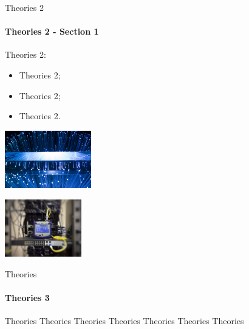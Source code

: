 \documentclass[t]{beamer}
\begin{document}
\begin{frame}{Theories 2}
\framesubtitle{Theories 2 - Section 1}
\label{P6 Theories}

Theories 2:
\begin{itemize}
\item Theories 2;
\item Theories 2;
\item Theories 2.
\end{itemize} 

\begin{center} 
        \begin{minipage}[t]{.35\textwidth}
            \centering
            \includegraphics[height =25mm]{image/a}
        \end{minipage}
    \hfill
        \begin{minipage}[t]{.6\textwidth}
            \centering
            \includegraphics[height =25mm]{image/b}
        \end{minipage}
\end{center}

\end{frame}


\begin{frame}{Theories}
\framesubtitle{Theories 3}
\label{P7 Theories}

Theories Theories Theories Theories Theories Theories Theories
\vspace{30pt}

\begin{center} 
\end{center} 

\end{frame}
\end{document}
